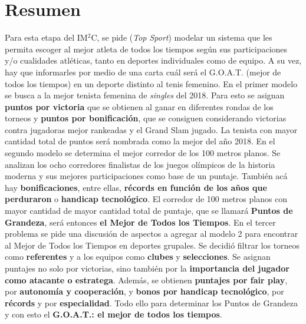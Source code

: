 \documentclass[a4paper]{article}
\begin{document}





\newpage

\newpage
\section{Resumen}
Para esta etapa del IM$^2$C, se pide (\textit{Top Sport}) modelar un sistema que les permita escoger al mejor atleta de todos los tiempos  según sus participaciones y/o cualidades atléticas, tanto en deportes individuales como de equipo. A su vez, hay que informarles por medio de una carta cuál será el G.O.A.T. (mejor de todos los tiempos) en un deporte distinto al tenis femenino. 
\newline\newline En el primer modelo se busca a la mejor tenista femenina de \textit{singles} del 2018. Para esto se asignan \textbf{puntos por victoria} que se obtienen al ganar en diferentes rondas de los torneos y \textbf{puntos por bonificación}, que se consiguen considerando victorias contra jugadoras mejor rankeadas y el Grand Slam jugado.  La tenista con mayor cantidad total de puntos será nombrada como la mejor del año 2018.\newline\newline
En el segundo modelo se determina el mejor corredor de los 100 metros planos. Se analizan los ocho corredores finalistas de los juegos olímpicos de la historia moderna y sus mejores participaciones como base de un puntaje. También acá hay \textbf{bonificaciones}, entre ellas, \textbf{récords en función de los años que perduraron} o \textbf{handicap tecnológico}. El corredor de 100 metros planos con mayor cantidad de mayor cantidad total de puntaje, que se llamará \textbf{Puntos de Grandeza}, será entonces \textbf{el Mejor de Todos los Tiempos}.\newline\newline 
En el tercer problema se pide una discusión de aspectos a agregar al modelo 2 para encontrar al Mejor de Todos los Tiempos en deportes grupales. Se decidió filtrar los torneos como \textbf{referentes} y a los equipos como \textbf{clubes} y \textbf{selecciones}. Se asignan puntajes no solo por victorias, sino también por la \textbf{importancia del jugador como atacante o estratega}. Además, se obtienen \textbf{puntajes por fair play}, por \textbf{autonomía y cooperación}, y \textbf{bonos por handicap tecnológico}, por \textbf{récords} y por \textbf{especialidad}. Todo ello para determinar los Puntos de Grandeza y con esto el \textbf{G.O.A.T.: el mejor de todos los tiempos}. 
\newpage
\end{document}
